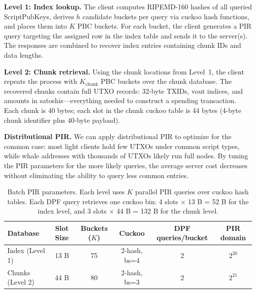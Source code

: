 \textbf{Level 1: Index lookup.} The client computes RIPEMD-160 hashes of all queried ScriptPubKeys, derives $h$ candidate buckets per query via cuckoo hash functions, and places them into $K$ PBC buckets. For each bucket, the client generates a PIR query targeting the assigned row in the index table and sends it to the server(s). The responses are combined to recover index entries containing chunk IDs and data lengths.

\textbf{Level 2: Chunk retrieval.} Using the chunk locations from Level~1, the client repeats the process with $K_\text{chunk}$ PBC buckets over the chunk database. The recovered chunks contain full UTXO records: 32-byte TXIDs, vout indices, and amounts in satoshis---everything needed to construct a spending transaction. Each chunk is 40 bytes; each slot in the chunk cuckoo table is 44 bytes (4-byte chunk identifier plus 40-byte payload).

\textbf{Distributional PIR.} We can apply distributional PIR \cite{lehmkuhl25} to optimize for the common case: most light clients hold few UTXOs under common script types, while whale addresses with thousands of UTXOs likely run full nodes. By tuning the PIR parameters for the more likely queries, the average server cost decreases without eliminating the ability to query less common entries.

\begin{table}[htbp]
\centering
\begin{tabular}{|l|c|c|c|c|c|}
\hline
\textbf{Database} & \textbf{Slot Size} & \textbf{Buckets ($K$)} & \textbf{Cuckoo} & \textbf{DPF queries/bucket} & \textbf{PIR domain} \\
\hline
Index (Level 1) & 13 B & 75 & 2-hash, bs=4 & 2 & $2^{20}$ \\
Chunks (Level 2) & 44 B & 80 & 2-hash, bs=3 & 2 & $2^{21}$ \\
\hline
\end{tabular}
\caption{Batch PIR parameters. Each level uses $K$ parallel PIR queries over cuckoo hash tables. Each DPF query retrieves one cuckoo bin: 4 slots $\times$ 13 B = 52 B for the index level, and 3 slots $\times$ 44 B = 132 B for the chunk level.}
\label{tab:databases}
\end{table}
